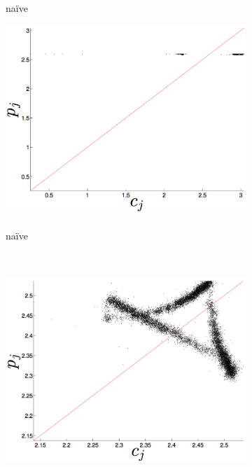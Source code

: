 \begin{figure}[htbp]
\begin{subfigure}{0.32\columnwidth}
    \caption{\gcc\\ na\"ive }
    \label{fig:gccMEAN}
  \end{subfigure}%
     \begin{subfigure}{0.32\columnwidth}
    \includegraphics[width=\columnwidth]{figs/svdfiveMeanForecast.png}
    \caption{\svdfive\\ na\"ive }
    \label{fig:gccMEAN}
  \end{subfigure}%
  \\
    \begin{subfigure}{0.32\columnwidth}
    \includegraphics[width=\columnwidth]{figs/colARIMAForecast.png}
    

\end{subfigure}
\end{figure}
